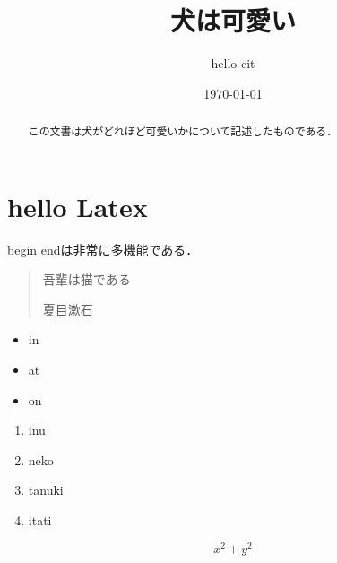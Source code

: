 \documentclass[dvipdfmx]{jsarticle}%
\title{犬は可愛い}
\author{hello cit}
\date{\today}
\begin{document}
\maketitle
\begin{abstract}
  この文書は犬がどれほど可愛いかについて記述したものである．
\end{abstract}
\tableofcontents%

\section{hello Latex}

begin endは非常に多機能である．

\begin{quote}
  吾輩は猫である


  \hfil 夏目漱石
\end{quote}


\begin{itemize}
  \item in
  \item at
  \item on
\end{itemize}

\begin{enumerate}
  \item inu
  \item neko
  \item tanuki
  \item itati
\end{enumerate}

\[
x^2 + y^2
\]

\end{document}
